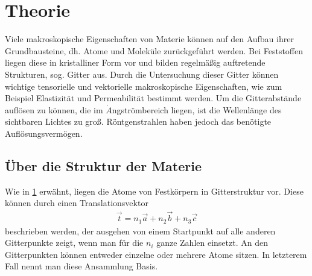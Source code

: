 

\section{Theorie}\label{sec:theorie}
Viele makroskopische Eigenschaften von Materie können auf den Aufbau ihrer Grundbausteine, dh. Atome und Moleküle zurückgeführt werden. Bei Feststoffen liegen diese in kristalliner Form vor und bilden regelmäßig auftretende Strukturen, sog. Gitter aus. Durch die Untersuchung dieser Gitter können wichtige tensorielle und vektorielle makroskopische Eigenschaften, wie zum Beispiel Elastizität und Permeabilität bestimmt werden. Um die Gitterabstände auflösen zu können, die im $\mathring{A}$ngströmbereich liegen, ist die Wellenlänge des sichtbaren Lichtes zu groß. Röntgenstrahlen haben jedoch das benötigte Auflösungsvermögen.

\subsection{Über die Struktur der Materie}
Wie in \ref{sec:theorie} erwähnt, liegen die Atome von Festkörpern in Gitterstruktur vor. Diese können durch einen Translationsvektor
\begin{align}
	\vec{t} = n_1\vec{a} +n_2\vec{b} + n_3\vec{c}
\end{align}
beschrieben werden, der ausgehen von einem Startpunkt auf alle anderen Gitterpunkte zeigt, wenn man für die $n_i$ ganze Zahlen einsetzt. An den Gitterpunkten können entweder einzelne oder mehrere Atome sitzen. In letzterem Fall nennt man diese Ansammlung Basis. 

